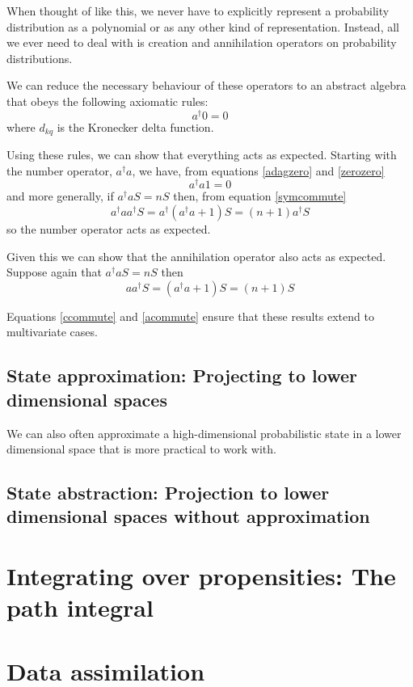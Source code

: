 \documentclass[letterpaper,twocolumn,10pt]{article}
\begin{document}
When thought of like this, we never have to explicitly represent a probability distribution as a polynomial or as any other kind of representation. Instead, all we ever need to deal with is creation and annihilation operators on probability distributions.

We can reduce the necessary behaviour of these operators to an abstract algebra that obeys the following axiomatic rules:
\begin{equation}
a^\dag 0 = 0
\label{zerozero}
\end{equation}
where $d_{kq}$ is the Kronecker delta function.

Using these rules, we can show that everything acts as expected. Starting with the number operator, $a^\dag a$, we have, from equations \ref{adagzero} and \ref{zerozero}
\[
a^\dag a 1 = 0
\]
and more generally, if $a^\dag a S = nS$ then, from equation \ref{symcommute}
\[
a^\dag a a^\dag S = a^\dag(a^\dag a +1)S = (n+1)a^\dag S
\]
so the number operator acts as expected.

Given this we can show that the annihilation operator also acts as expected. Suppose again that $a^\dag a S = nS$ then
\[
a a^\dag S = (a^\dag a+1)S = (n+1)S
\]

Equations \ref{ccommute} and \ref{acommute} ensure that these results extend to multivariate cases.

\subsection{State approximation: Projecting to lower dimensional spaces}

We can also often approximate a high-dimensional probabilistic state in a lower dimensional space that is more practical to work with.

\subsection{State abstraction: Projection to lower dimensional spaces without approximation}


\section{Integrating over propensities: The path integral}

\section{Data assimilation}
\end{document}
